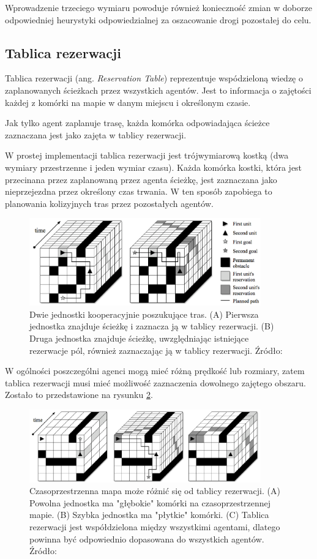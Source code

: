 Wprowadzenie trzeciego wymiaru powoduje również konieczność zmian w doborze odpowiedniej heurystyki odpowiedzialnej za oszacowanie drogi pozostałej do celu.

\subsection{Tablica rezerwacji}
Tablica rezerwacji (ang. {\it Reservation Table}) reprezentuje wspódzieloną wiedzę o zaplanowanych ścieżkach przez wszystkich agentów.
Jest to informacja o zajętości każdej z komórki na mapie w danym miejscu i określonym czasie. \cite{cooppath}

Jak tylko agent zaplanuje trasę, każda komórka odpowiadająca ścieżce zaznaczana jest jako zajęta w tablicy rezerwacji.

W prostej implementacji tablica rezerwacji jest trójwymiarową kostką (dwa wymiary przestrzenne i jeden wymiar czasu).
Każda komórka kostki, która jest przecinana przez zaplanowaną przez agenta ścieżkę, jest zaznaczana jako nieprzejezdna przez określony czas trwania. W ten sposób zapobiega to planowania kolizyjnych tras przez pozostałych agentów.

\begin{figure}[H]
	\centering
	\includegraphics[width=10cm]{img/reservation-table}
	\caption{Dwie jednostki kooperacyjnie poszukujące tras. (A) Pierwsza jednostka znajduje ścieżkę i zaznacza ją w tablicy rezerwacji. (B) Druga jednostka znajduje ścieżkę, uwzględniając istniejące rezerwacje pól, również zaznaczając ją w tablicy rezerwacji. Źródło: \cite{cooppath}}
	\label{fig:img_reservation-table}
\end{figure}

W ogólności poszczególni agenci mogą mieć różną prędkość lub rozmiary, zatem tablica rezerwacji musi mieć możliwość zaznaczenia dowolnego zajętego obszaru. Zostało to przedstawione na rysunku \ref{fig:img_reservation-table-2}.

\begin{figure}[H]
	\centering
	\includegraphics[width=10cm]{img/reservation-table-2}
	\caption{Czasoprzestrzenna mapa może różnić się od tablicy rezerwacji. (A) Powolna jednostka ma "głębokie" komórki na czasoprzestrzennej mapie. (B) Szybka jednostka ma "płytkie" komórki. (C) Tablica rezerwacji jest współdzielona między wszystkimi agentami, dlatego powinna być odpowiednio dopasowana do wszystkich agentów. Źródło: \cite{cooppath}}
	\label{fig:img_reservation-table-2}
\end{figure}

